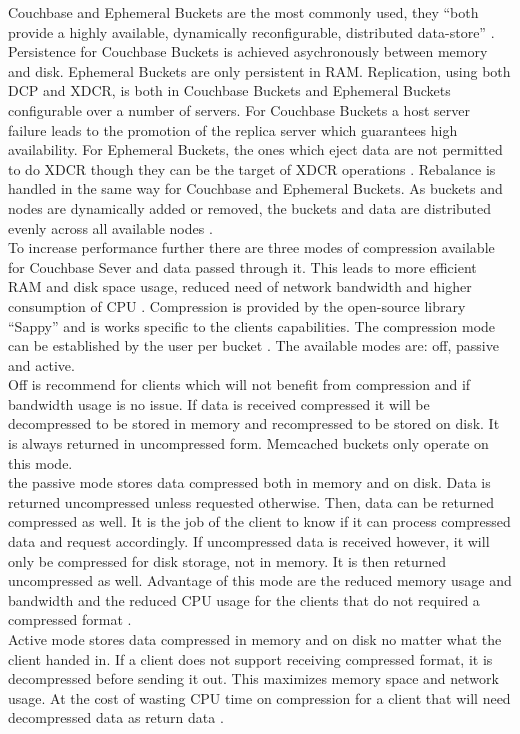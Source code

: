 Couchbase and Ephemeral Buckets are the most commonly used, they \enquote{both provide a highly available, dynamically reconfigurable, distributed data-store} \parencite{couchbaseDocuBuckets}. Persistence for Couchbase Buckets is achieved asychronously between memory and disk. Ephemeral Buckets are only persistent in RAM. Replication, using both DCP and XDCR, is both in Couchbase Buckets and Ephemeral Buckets configurable over a number of servers. For Couchbase Buckets a host server failure leads to the promotion of the replica server which guarantees high availability. For Ephemeral Buckets, the ones which eject data are not permitted to do XDCR though they can be the target of XDCR operations \parencite{couchbaseDocuBuckets}. Rebalance is handled in the same way for Couchbase and Ephemeral Buckets. As buckets and nodes are dynamically added or removed, the buckets and data are distributed evenly across all available nodes \parencite{couchbaseDocuBuckets}.\\
To increase performance further there are three modes of compression available for Couchbase Sever and data passed through it. This leads to more efficient RAM and disk space usage, reduced need of network bandwidth and higher consumption of CPU \parencite{couchbaseDocuCompression}. Compression is provided by the open-source library \enquote{Sappy} and is works specific to the clients capabilities. The compression mode can be established by the user per bucket \parencite{couchbaseDocuCompression}. The available modes are: off, passive and active.\\
Off is recommend for clients which will not benefit from compression and if bandwidth usage is no issue. If data is received compressed it will be decompressed to be stored in memory and recompressed to be stored on disk. It is always returned in uncompressed form. Memcached buckets only operate on this mode\parencite{couchbaseDocuCompression}. \\
the passive mode stores data compressed both in memory and on disk. Data is returned uncompressed unless requested otherwise. Then, data can be returned compressed as well. It is the job of the client to know if it can process compressed data and request accordingly. If uncompressed data is received however, it will only be compressed for disk storage, not in memory. It is then returned uncompressed as well. Advantage of this mode are the reduced memory usage and bandwidth and the reduced CPU usage for the clients that do not required a compressed format \parencite{couchbaseDocuCompression}.\\
Active mode stores data compressed in memory and on disk no matter what the client handed in. If a client does not support receiving compressed format, it is decompressed before sending it out. This maximizes memory space and network usage. At the cost of wasting CPU time on compression for a client that will need decompressed data as return data \parencite{couchbaseDocuCompression}.
